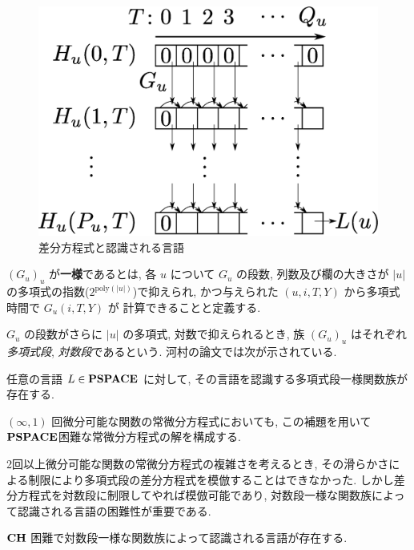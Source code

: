  \begin{figure}
  \label{fig:divp}
  \begin{center}
   \includegraphics[height=0.2\textheight]{image/divp.eps}
  \end{center}
  \caption{差分方程式と認識される言語}
 \end{figure}

$(G_u)_u$ が{\bf 一様}であるとは,
各 $u$ について $G _u$ の段数, 列数及び欄の大きさが $|u|$ の多項式の指数($2^{\mathrm{poly} (|u|)}$)で抑えられ, 
かつ与えられた $(u, i, T, Y)$ から多項式時間で $G_u(i, T, Y)$ が
計算できることと定義する.

$G_u$ の段数がさらに $|u|$ の多項式, 対数で抑えられるとき, 
族 $(G_u) _u$ はそれぞれ\emph{多項式段}, \emph{対数段}であるという. 
河村の論文では次が示されている.

\begin{lemma}
 \label{DIVPpolyIsPSPACEhard}
 任意の言語 $L \in \mathbf{PSPACE}$ に対して,
 その言語を認識する多項式段一様関数族が存在する.
\end{lemma}

$(\infty, 1)$ 回微分可能な関数の常微分方程式においても,
この補題を用いて$\mathbf{PSPACE}$困難な常微分方程式の解を構成する.

2回以上微分可能な関数の常微分方程式の複雑さを考えるとき,
その滑らかさによる制限により多項式段の差分方程式を模倣することはできなかった.
しかし差分方程式を対数段に制限してやれば模倣可能であり,
対数段一様な関数族によって認識される言語の困難性が重要である.

\begin{lemma}
 \label{DIVPlogIsCHhard}
 $\mathbf{CH}$ 困難で対数段一様な関数族によって認識される言語が存在する.
\end{lemma}

